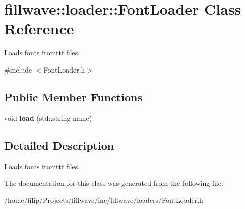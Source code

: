 \hypertarget{classfillwave_1_1loader_1_1FontLoader}{}\section{fillwave\+:\+:loader\+:\+:Font\+Loader Class Reference}
\label{classfillwave_1_1loader_1_1FontLoader}


Loads fonts fromttf files.  




{\ttfamily \#include $<$Font\+Loader.\+h$>$}

\subsection*{Public Member Functions}
\begin{DoxyCompactItemize}
\item 
\hypertarget{classfillwave_1_1loader_1_1FontLoader_a5f62a54aba9cc5b78326b54ccd329896}{}void {\bfseries load} (std\+::string name)\label{classfillwave_1_1loader_1_1FontLoader_a5f62a54aba9cc5b78326b54ccd329896}

\end{DoxyCompactItemize}


\subsection{Detailed Description}
Loads fonts fromttf files. 

The documentation for this class was generated from the following file\+:\begin{DoxyCompactItemize}
\item 
/home/filip/\+Projects/fillwave/inc/fillwave/loaders/Font\+Loader.\+h\end{DoxyCompactItemize}
